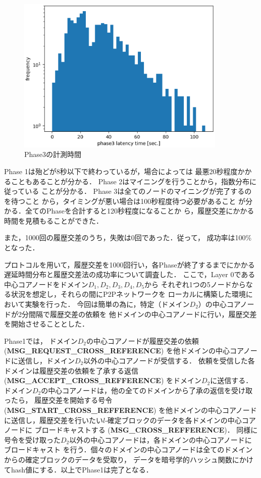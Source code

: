 \documentclass[a4paper,12pt]{jsarticle}
\begin{document}
%
%
\begin{figure}[H]%
  \begin{center}
    \includegraphics[width=100mm]{pht/phase3-sec-hist.eps}
  \end{center}
  \caption{Phase3の計測時間}
  \label{fig:phase3}
\end{figure}
%
Phase 1は殆どが8秒以下で終わっているが，場合によっては
最悪20秒程度かかることもあることが分かる．
Phase 2はマイニングを行うことから，指数分布に従っている
ことが分かる．
Phase 3は全てのノードのマイニングが完了するのを待つこと
から，タイミングが悪い場合は100秒程度待つ必要があること
が分かる．全てのPhaseを合計すると120秒程度になることか
ら，履歴交差にかかる時間を見積もることができた．

また，1000回の履歴交差のうち，失敗は0回であった．従って，
成功率は100\%となった．

プロトコルを用いて，履歴交差を1000回行い，各Phaseが終了するまでにかかる
遅延時間分布と履歴交差法の成功率について調査した．
ここで，Layer 0である中心コアノードをドメイン$D_1, D_2, D_3, D_4, D_5$から
それぞれ1つの5ノードからなる状況を想定し，それらの間にP2Pネットワークを
ローカルに構築した環境において実験を行った．
今回は簡単の為に，特定（ドメイン$D_2$）の中心コアノードが2分間隔で履歴交差の依頼を
他ドメインの中心コアノードに行い，履歴交差を開始させることとした．

Phase1では，
ドメイン$D_2$の中心コアノードが履歴交差の依頼 (\textbf{MSG\_REQUEST\_CROSS\_REFERENCE})
を他ドメインの中心コアノードに送信し，ドメイン$D_2$以外の中心コアノードが受信する．
依頼を受信した各ドメインは履歴交差の依頼を了承する返信 (\textbf{MSG\_ACCEPT\_CROSS\_REFFERENCE})
をドメイン$D_2$に送信する．
ドメイン$D_2$の中心コアノードは，他の全てのドメインから了承の返信を受け取ったら，
履歴交差を開始する号令 (\textbf{MSG\_START\_CROSS\_REFFERENCE}) を他ドメインの中心コアノード
に送信し，履歴交差を行いたい$l$-確定ブロックのデータを各ドメインの中心コアノードに
ブロードキャストする (\textbf{MSG\_CROSS\_REFFERENCE})．
同様に号令を受け取った$D_2$以外の中心コアノードは，各ドメインの中心コアノードにブロードキャスト
を行う．個々のドメインの中心コアノードは全てのドメインからの確定ブロックのデータを受取り，
データを暗号学的ハッシュ関数にかけてhash値にする．以上でPhase1は完了となる．
\end{document}
